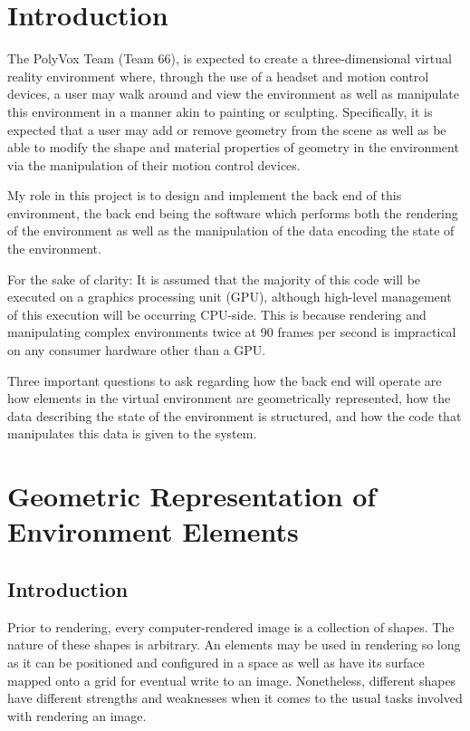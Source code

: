 \documentclass[onecolumn, draftclsnofoot,10pt, compsoc]{IEEEtran}
\begin{document}
\section{Introduction}

The PolyVox Team (Team 66), is expected to create a three-dimensional virtual reality environment where, through the use of a headset and motion control devices, a user may walk around and view the environment as well as manipulate this environment in a manner akin to painting or sculpting.
Specifically, it is expected that a user may add or remove geometry from the scene as well as be able to modify the shape and material properties of geometry in the environment via the manipulation of their motion control devices.

My role in this project is to design and implement the back end of this environment, the back end being the software which performs both the rendering of the environment as well as the manipulation of the data encoding the state of the environment.

For the sake of clarity: It is assumed that the majority of this code will be executed on a graphics processing unit (GPU), although high-level management of this execution will be occurring CPU-side.
This is because rendering and manipulating complex environments twice at 90 frames per second is impractical on any consumer hardware other than a GPU.

Three important questions to ask regarding how the back end will operate are how elements in the virtual environment are geometrically represented, how the data describing the state of the environment is structured, and how the code that manipulates this data is given to the system.


\section{Geometric Representation of Environment Elements}
\subsection{Introduction}

Prior to rendering, every computer-rendered image is a collection of shapes.
The nature of these shapes is arbitrary.
An elements may be used in rendering so long as it can be positioned and configured in a space as well as have its surface mapped onto a grid for eventual write to an image.
Nonetheless, different shapes have different strengths and weaknesses when it comes to the usual tasks involved with rendering an image.
\end{document}
